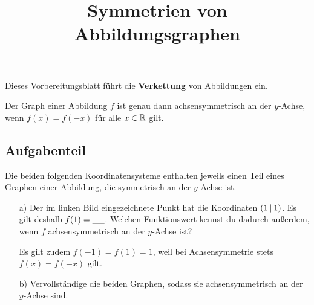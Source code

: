 \documentclass[]{uebungsblatt}
\title{Symmetrien von Abbildungsgraphen}
\begin{document}
\maketitle
\begin{contents}
    Dieses Vorbereitungsblatt führt die \textbf{Verkettung} von Abbildungen ein.
\end{contents}
\begin{theorem}
    Der Graph einer Abbildung $f$ ist genau dann achsensymmetrisch an der $y$-Achse, wenn $f(x)=f(-x)$ für alle $x\in\mathbb{R}$ gilt.
\end{theorem}
\subsection*{Aufgabenteil}
\begin{exercise}
    Die beiden folgenden Koordinatensysteme enthalten jeweils einen Teil eines Graphen einer Abbildung, die symmetrisch an der $y$-Achse ist.
    \begin{multicols}{2}\centering
        
    \end{multicols}
    \begin{enumerate}
        \item[a)] Der im linken Bild eingezeichnete Punkt hat die Koordinaten $\left(1 \:\middle|\: 1\right)$. Es gilt deshalb $f(1)=\answerfield{0.5cm}{1}$. Welchen Funktionswert kennst du dadurch außerdem, wenn $f$ achsensymmetrisch an der $y$-Achse ist?
        \begin{answerbox}[.3in]
            Es gilt zudem $f(-1)=f(1)=1$, weil bei Achsensymmetrie stets $f(x)=f(-x)$ gilt.
        \end{answerbox}
        \item[b)] Vervollständige die beiden Graphen, sodass sie achsensymmetrisch an der $y$-Achse sind.
    \end{enumerate}
\end{exercise}
\end{document}
